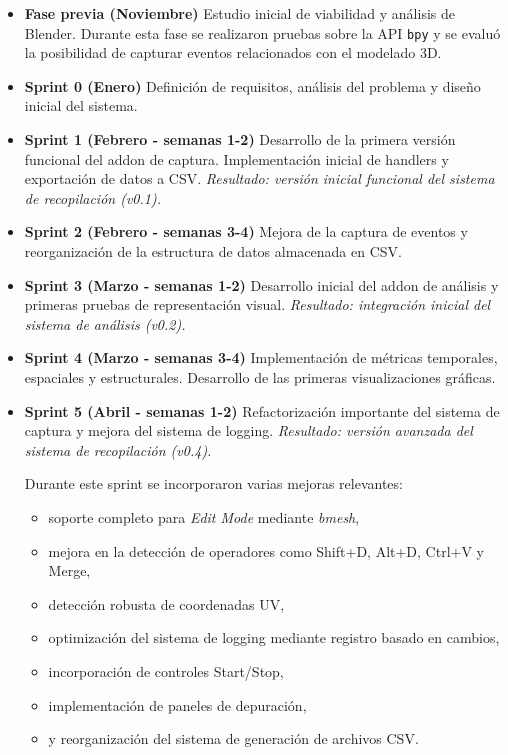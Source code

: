 \begin{itemize}

    \item \textbf{Fase previa (Noviembre)}  
    Estudio inicial de viabilidad y análisis de Blender. Durante esta fase se realizaron pruebas sobre la API \texttt{bpy} y se evaluó la posibilidad de capturar eventos relacionados con el modelado 3D.

    \item \textbf{Sprint 0 (Enero)}  
    Definición de requisitos, análisis del problema y diseño inicial del sistema.

    \item \textbf{Sprint 1 (Febrero - semanas 1-2)}  
    Desarrollo de la primera versión funcional del addon de captura. Implementación inicial de handlers y exportación de datos a CSV.  
    \textit{Resultado: versión inicial funcional del sistema de recopilación (v0.1).}

    \item \textbf{Sprint 2 (Febrero - semanas 3-4)}  
    Mejora de la captura de eventos y reorganización de la estructura de datos almacenada en CSV.

    \item \textbf{Sprint 3 (Marzo - semanas 1-2)}  
    Desarrollo inicial del addon de análisis y primeras pruebas de representación visual.  
    \textit{Resultado: integración inicial del sistema de análisis (v0.2).}

    \item \textbf{Sprint 4 (Marzo - semanas 3-4)}  
    Implementación de métricas temporales, espaciales y estructurales. Desarrollo de las primeras visualizaciones gráficas.

    \item \textbf{Sprint 5 (Abril - semanas 1-2)}  
    Refactorización importante del sistema de captura y mejora del sistema de logging.  
    \textit{Resultado: versión avanzada del sistema de recopilación (v0.4).}

    Durante este sprint se incorporaron varias mejoras relevantes:

    \begin{itemize}
        \item soporte completo para \textit{Edit Mode} mediante \textit{bmesh},
        \item mejora en la detección de operadores como Shift+D, Alt+D, Ctrl+V y Merge,
        \item detección robusta de coordenadas UV,
        \item optimización del sistema de logging mediante registro basado en cambios,
        \item incorporación de controles Start/Stop,
        \item implementación de paneles de depuración,
        \item y reorganización del sistema de generación de archivos CSV.
    \end{itemize}


\end{itemize}
